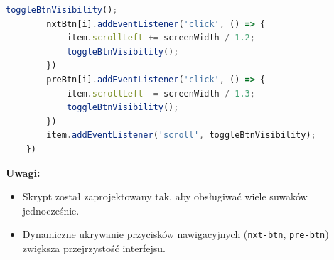\documentclass[12pt,a4paper,oneside]{article}
\theoremstyle{definition}
\numberwithin{equation}{section}
\begin{document}
\begin{itemize}
\begin{lstlisting}[language=JavaScript, caption=Skrypt home\_page.js]
        toggleBtnVisibility();
        nxtBtn[i].addEventListener('click', () => {
            item.scrollLeft += screenWidth / 1.2;
            toggleBtnVisibility();
        })
        preBtn[i].addEventListener('click', () => {
            item.scrollLeft -= screenWidth / 1.3;
            toggleBtnVisibility();
        })
        item.addEventListener('scroll', toggleBtnVisibility);
    })
        \end{lstlisting}
        \textbf{Uwagi:}
        \begin{itemize}
            \item Skrypt został zaprojektowany tak, aby obsługiwać wiele suwaków jednocześnie.
            \item Dynamiczne ukrywanie przycisków nawigacyjnych (\texttt{nxt-btn}, \texttt{pre-btn}) zwiększa przejrzystość interfejsu.
        \end{itemize}
\end{itemize}
\end{document}
